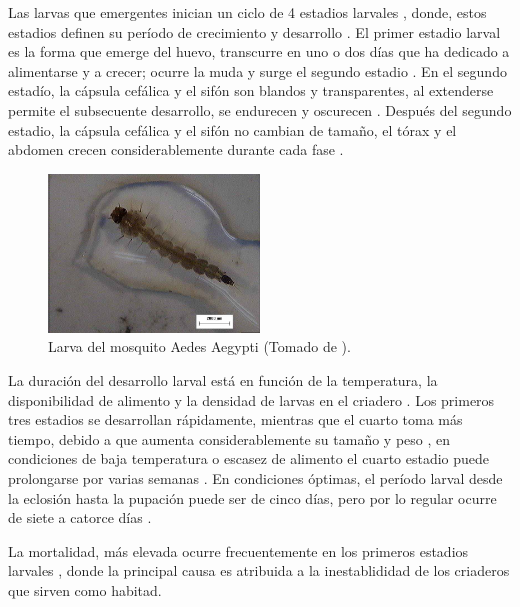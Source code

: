 Las larvas que emergentes inician un ciclo de 4 estadios larvales \cite{web-site:gMonteroBiologia},
donde, estos estadios definen su período de crecimiento y desarrollo \cite{ThironIzcazaJ2003}. El
primer estadio larval es la forma que emerge del huevo, transcurre en uno o dos días que ha
dedicado a alimentarse y a crecer; ocurre la muda y surge el segundo estadio
\cite{ThironIzcazaJ2003}. En el segundo estadío, la cápsula cefálica y el sifón son blandos y
transparentes, al extenderse permite el subsecuente desarrollo, se endurecen y oscurecen
\cite{ThironIzcazaJ2003}. Después del segundo estadio, la cápsula cefálica y el sifón no cambian
de tamaño, el tórax y el abdomen crecen considerablemente durante cada fase
\cite{ThironIzcazaJ2003}.

\begin{figure}[H]
\centering
\includegraphics[width=0.5\textwidth]{capitulo-3/graphics/larva.png}
\caption{\label{fig:cap3-larvas} Larva del mosquito Aedes Aegypti (Tomado de
\cite{sivanathan2006ecology}).}
\end{figure}

La duración del desarrollo larval está en función de la temperatura, la disponibilidad de alimento
y la densidad de larvas en el criadero \cite{ThironIzcazaJ2003}. Los primeros tres estadios se
desarrollan rápidamente, mientras que el cuarto toma más tiempo, debido a que aumenta
considerablemente su tamaño y peso \cite{ThironIzcazaJ2003, web-site:gMonteroBiologia},
en condiciones de baja temperatura o escasez de alimento el cuarto estadio puede prolongarse por
varias semanas \cite{ThironIzcazaJ2003}. En condiciones óptimas, el período larval desde la
eclosión hasta la pupación puede ser de cinco días, pero por lo regular ocurre de siete a catorce
días \cite{ThironIzcazaJ2003}.

La mortalidad, más elevada ocurre frecuentemente en los primeros estadios larvales
\cite{ThironIzcazaJ2003}, donde la principal causa es atribuida a la inestablididad de los
criaderos que sirven como habitad.

